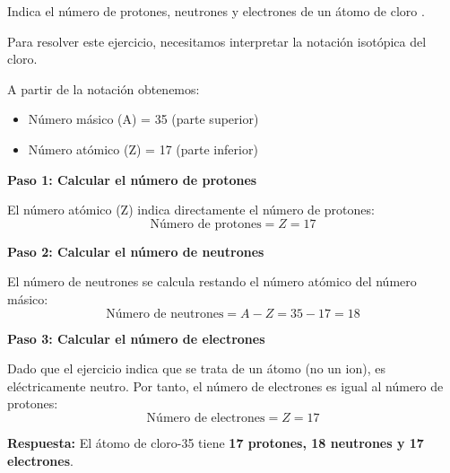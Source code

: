 \begin{exercise}
    Indica el número de protones, neutrones y electrones de un átomo de cloro .

    \begin{solu}
        Para resolver este ejercicio, necesitamos interpretar la notación isotópica del cloro.

        A partir de la notación  obtenemos:
        \begin{itemize}
            \item Número másico (A) = 35 (parte superior)
            \item Número atómico (Z) = 17 (parte inferior)
        \end{itemize}

        \textbf{Paso 1: Calcular el número de protones}

        El número atómico (Z) indica directamente el número de protones:
        \[
            \text{Número de protones} = Z = 17
        \]

        \textbf{Paso 2: Calcular el número de neutrones}

        El número de neutrones se calcula restando el número atómico del número másico:
        \[
            \text{Número de neutrones} = A - Z = 35 - 17 = 18
        \]

        \textbf{Paso 3: Calcular el número de electrones}

        Dado que el ejercicio indica que se trata de un átomo (no un ion), es eléctricamente neutro. Por tanto, el número de electrones es igual al número de protones:
        \[
            \text{Número de electrones} = Z = 17
        \]

        \textbf{Respuesta:} El átomo de cloro-35 tiene \textbf{17 protones, 18 neutrones y 17 electrones}.
    \end{solu}
\end{exercise}
